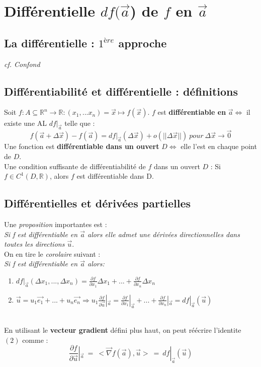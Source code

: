 \documentclass	[11pt, a4paper, openany]{book}
\begin{document}
\section{Différentielle $df(\vec{a}$) de $f$ en $\vec{a}$}
\subsection{La différentielle : $1^{ère}$ approche}
\textit{cf. Confond}

\subsection{Différentiabilité et différentielle : définitions}
Soit $f : A \subseteq \mathbb{R}^n \rightarrow \mathbb{R} : (x_1, ... x_n) = \vec{x} \mapsto f(\vec{x})$. $f$ est \textbf{différentiable en} $\vec{a} \Leftrightarrow$ il existe une AL $df|_{\vec{a}}$ telle que :
$$f(\vec{a} + \Delta\vec{x}) - f(\vec{a}) = df|_{\vec{a}}(\Delta\vec{x}) + o(||\Delta\vec{x}||)\ pour\ \Delta\vec{x} \rightarrow \vec{0}$$
Une fonction est \textbf{différentiable dans un ouvert} $D \Leftrightarrow$ elle l'est en chaque point de $D$.\\

Une condition suffisante de différentiabilité de $f$ dans un ouvert $D$ : Si $f \in C^1(D, \mathbb{R})$, alors $f$ est différentiable dans D.

\subsection{Différentielles et dérivées partielles}
Une \textit{proposition} importantes est :\\
\textit{Si f est différentiable en $\vec{a}$ alors elle admet une dérivées directionnelles dans toutes les directions $\vec{u}$}.\\

On en tire le \textit{corolaire} suivant :\\
\textit{Si f est différentiable en $\vec{a}$ alors:}
\begin{enumerate}
\item $df|_{\vec{a}}(\Delta x_1, ..., \Delta x_n) = \frac{\partial f}{\partial x_1} \Delta x_1 + ... + \frac{\partial f}{\partial x_n} \Delta x_n$
\item $\vec{u} = u_1\vec{e_1} + ... + u_n\vec{e_n} \Rightarrow u_1 \frac{\partial f}{\partial \vec{u}}|_{\vec{a}} = \frac{\partial f}{\partial x_1}|_{\vec{a}} + ... + \frac{\partial f}{\partial x_n}|_{\vec{a}} = df|_{\vec{a}}(\vec{u})$
\end{enumerate}\ \\
En utilisant le \textbf{vecteur gradient} défini plus haut, on peut réécrire l'identite $(2)$ comme :
$$\frac{\partial f}{\partial\vec{u}}|_{\vec{a}}\ =\ <\vec{\nabla}f(\vec{a}), \vec{u}>\ =\ df|_{\vec{a}}(\vec{u})$$
\end{document}
